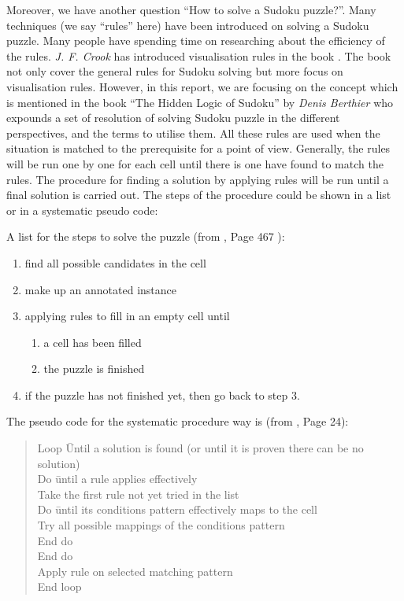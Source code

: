 \documentclass[11pt]{report}
\begin{document}
Moreover, we have another question ``How to solve a Sudoku puzzle?''. Many techniques (we say ``rules'' here) have been introduced on solving a Sudoku puzzle. Many people have spending time on researching about the efficiency of the rules. \emph{J. F. Crook} has introduced visualisation rules in the book \cite{Colloby2007Sudoku}. The book not only cover the general rules for Sudoku solving but more focus on visualisation rules. However, in this report, we are focusing on the concept which is mentioned in the book ``The Hidden Logic of Sudoku\cite{Berthier2007Sudoku}'' by \emph{Denis Berthier} who expounds a set of resolution of solving Sudoku puzzle in the different perspectives, and the terms to utilise them. All these rules are used when the situation is matched to the prerequisite for a point of view. Generally, the rules will be run one by one for each cell until there is one have found to match the rules. The procedure for finding a solution by applying rules will be run until a final solution is carried out. The steps of the procedure could be shown in a list or in a systematic pseudo code:

A list for the steps to solve the puzzle (from \cite{Crook2009Algorithm}, Page 467 ):
\begin{enumerate}
\item find all possible candidates in the cell
\item make up an annotated instance
\item applying rules to fill in an empty cell until
\begin{enumerate}
\item a cell has been filled
\item the puzzle is finished
\end{enumerate}
\item if the puzzle has not finished yet, then go back to step 3.
\end{enumerate}


The pseudo code for the systematic procedure way is (from \cite{Berthier2007Sudoku}, Page 24):
\begin{quote}
\begin{tabbing}
Loop \=Until  a solution is found (or until it is proven there can be no solution)\\
\>Do \=until a rule applies  effectively \\
\>\>Take the first rule not yet tried in the list \\
\>\>Do \=until its conditions pattern effectively maps to the cell \\
\>\>\>Try all possible mappings of the conditions pattern \\
\>\>End do\\
\>End do\\
\>Apply rule on selected matching pattern\\
End loop\\
\end{tabbing}
\end{quote}
\end{document}
